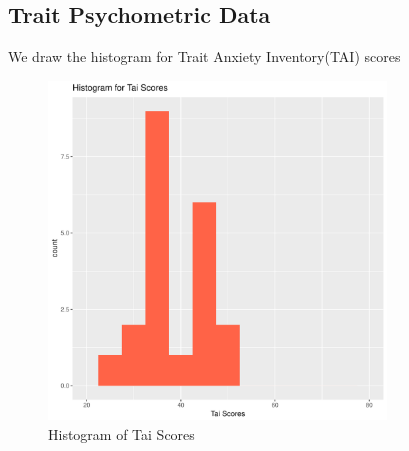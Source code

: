\documentclass[12pt,epsf]{report}
\begin{document}
\subsection*{Trait Psychometric Data}
We draw the histogram for Trait Anxiety Inventory(TAI) scores\\
\begin{figure}[!htb]
	\centering
	\includegraphics[width=0.8\textwidth]{tai_plot.pdf}
	\caption{Histogram of Tai Scores}
	\centering
\end{figure}
\newpage
\end{document}
